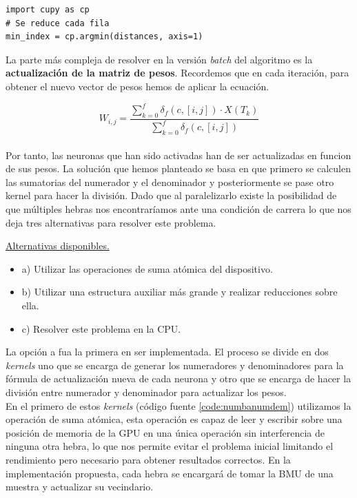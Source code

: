 \begin{code}
\begin{verbatim}
import cupy as cp
# Se reduce cada fila
min_index = cp.argmin(distances, axis=1)
\end{verbatim}
\label{code:cupyreduce2}
\end{code}

La parte más compleja de resolver en la versión \textit{batch} del algoritmo es la \textbf{actualización de la matriz de pesos}. Recordemos que en cada iteración, para obtener el nuevo vector de pesos hemos de aplicar la ecuación.

$$
 W_{i, j} = \frac{\sum_{k=0}^{f} \delta_f(c, [i,j]) \cdot X(T_k) }{\sum_{k=0}^{f} \delta_f(c, [i,j])}
$$\\

Por tanto, las neuronas que han sido activadas han de ser actualizadas en funcion de sus pesos. La solución que hemos planteado se basa en que primero se calculen las sumatorias del numerador y el denominador y posteriormente se pase otro kernel para hacer la división. Dado que al paralelizarlo existe la posibilidad de que múltiples hebras nos encontraríamos ante una condición de carrera lo que nos deja tres alternativas para resolver este problema.

\underline{Alternativas disponibles.}
\begin{itemize}
  \item a) Utilizar las operaciones de suma atómica del dispositivo.
  \item b) Utilizar una estructura auxiliar más grande y realizar reducciones sobre ella.
  \item c) Resolver este problema en la CPU.
\end{itemize}

La {opción a} fua la primera en ser implementada. El proceso se divide en dos \textit{kernels} uno que se encarga de generar los numeradores y denominadores para la fórmula de actualización nueva de cada neurona y otro que se encarga de hacer la división entre numerador y denominador para actualizar los pesos.\\

En el primero de estos \textit{kernels} (código fuente \ref{code:numbanumdem}) utilizamos la operación de suma atómica, esta operación es capaz de leer y escribir sobre una posición de memoria de la GPU en una única operación sin interferencia de ninguna otra hebra, lo que nos permite evitar el problema inicial limitando el rendimiento pero necesario para obtener resultados correctos. En la implementación propuesta, cada hebra se encargará de tomar la BMU de una muestra y actualizar su vecindario. 

